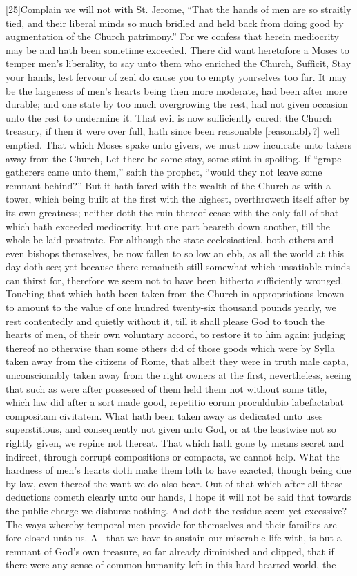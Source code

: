 [25]Complain we will not with St. Jerome, “That the hands of men are so straitly tied, and their liberal minds so much bridled and held back from doing good by augmentation of the Church patrimony.” For we confess that herein  mediocrity may be and hath been sometime exceeded. There did want heretofore a Moses to temper men’s liberality, to say unto them who enriched the Church, Sufficit, Stay your hands, lest fervour of zeal do cause you to empty yourselves too far. It may be the largeness of men’s hearts being then more moderate, had been after more durable; and one state by too much overgrowing the rest, had not given occasion unto the rest to undermine it. That evil is now sufficiently cured: the Church treasury, if then it were over full, hath since been reasonable [reasonably?] well emptied. That which Moses spake unto givers, we must now inculcate unto takers away from the Church, Let there be some stay, some stint in spoiling. If “grape-gatherers came unto them,” saith the prophet, “would they not leave some remnant behind?” But it hath fared with the wealth of the Church as with a tower, which being built at the first with the highest, overthroweth itself after by its own greatness; neither doth the ruin thereof cease with the only fall of that which hath exceeded mediocrity, but one part beareth down another, till the whole be laid prostrate. For although the state ecclesiastical, both others and even bishops themselves, be now fallen to so low an ebb, as all the world at this day doth see; yet because there remaineth still somewhat which unsatiable minds can thirst for, therefore we seem not to have been hitherto sufficiently wronged. Touching that which hath been taken from the Church in appropriations known to amount to the value of one hundred twenty-six thousand pounds yearly, we rest contentedly and quietly without it, till it shall please God to touch the hearts of men, of their own voluntary accord, to restore it to him again; judging thereof no otherwise than some others did of those goods which were by Sylla taken away from the citizens of Rome, that albeit they were in truth male capta, unconscionably taken away from the right owners at the first, nevertheless, seeing that such as were after possessed of them held them not without some title, which law did after a sort made good, repetitio eorum proculdubio labefactabat compositam civitatem. What hath been taken away as dedicated unto uses superstitious, and consequently not given unto God,  or at the leastwise not so rightly given, we repine not thereat. That which hath gone by means secret and indirect, through corrupt compositions or compacts, we cannot help. What the hardness of men’s hearts doth make them loth to have exacted, though being due by law, even thereof the want we do also bear. Out of that which after all these deductions cometh clearly unto our hands, I hope it will not be said that towards the public charge we disburse nothing. And doth the residue seem yet excessive? The ways whereby temporal men provide for themselves and their families are fore-closed unto us. All that we have to sustain our miserable life with, is but a remnant of God’s own treasure, so far already diminished and clipped, that if there were any sense of common humanity left in this hard-hearted world, the 